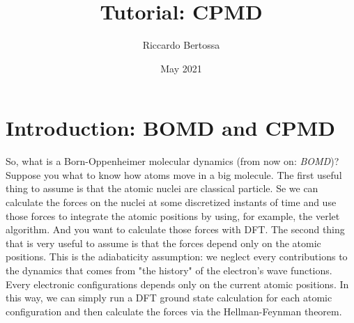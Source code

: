 \documentclass{article}
\title{Tutorial: CPMD}
\author{Riccardo Bertossa}
\date{May 2021}
\begin{document}
\maketitle

\section{Introduction: BOMD and CPMD}
So, what is a Born-Oppenheimer molecular dynamics (from now on: \emph{BOMD})? Suppose you what to know how atoms move in a big molecule. The first useful thing to assume is that the atomic nuclei are classical particle. Se we can calculate the forces on the nuclei at some discretized instants of time and use those forces to integrate the atomic positions by using, for example, the verlet algorithm. And you want to calculate those forces with DFT. The second thing that is very useful to assume is that the forces depend only on the atomic positions. This is the adiabaticity assumption: we neglect every contributions to the dynamics that comes from "the history" of the electron's wave functions. Every electronic configurations depends only on the current atomic positions. In this way, we can simply run a DFT ground state calculation for each atomic configuration and then calculate the forces via the Hellman-Feynman theorem.
\end{document}
